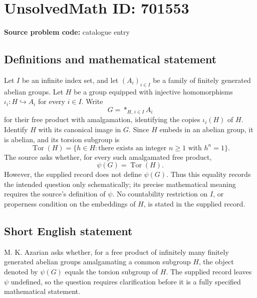 \documentclass[11pt]{article}
\begin{document}
\section*{UnsolvedMath ID: 701553}
\textbf{Source problem code:} catalogue entry
\subsection{Definitions and mathematical statement}
Let \(I\) be an infinite index set, and let \((A_i)_{i\in I}\) be a family of finitely generated abelian groups. Let \(H\) be a group equipped with injective homomorphisms \(\iota_i:H\hookrightarrow A_i\) for every \(i\in I\). Write
\[
G=\mathop{\ast}_{H,\,i\in I} A_i
\]
for their free product with amalgamation, identifying the copies \(\iota_i(H)\) of \(H\). Identify \(H\) with its canonical image in \(G\). Since \(H\) embeds in an abelian group, it is abelian, and its torsion subgroup is
\[
\operatorname{Tor}(H)=\{h\in H:\text{there exists an integer }n\geq 1\text{ with }h^n=1\}.
\]
The source asks whether, for every such amalgamated free product,
\[
\psi(G)=\operatorname{Tor}(H).
\]
However, the supplied record does not define \(\psi(G)\). Thus this equality records the intended question only schematically; its precise mathematical meaning requires the source's definition of \(\psi\). No countability restriction on \(I\), or properness condition on the embeddings of \(H\), is stated in the supplied record.
\subsection{Short English statement}
M. K. Azarian asks whether, for a free product of infinitely many finitely generated abelian groups amalgamating a common subgroup \(H\), the object denoted by \(\psi(G)\) equals the torsion subgroup of \(H\). The supplied record leaves \(\psi\) undefined, so the question requires clarification before it is a fully specified mathematical statement.
\end{document}
